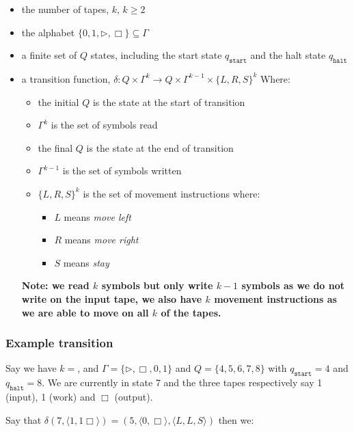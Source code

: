 \documentclass{article}
\begin{document}
\begin{itemize}
  \item the number of tapes, $k$, $k \geq 2$
  \item the alphabet $\{ 0,1,\rhd,\Box \} \subseteq \Gamma $
  \item a finite set of $Q$ states, including the start state $q_{\texttt{start} }$ and the halt state $q_{\texttt{halt} }$
  \item a transition function, $\delta: Q \times \Gamma^{k} \rightarrow Q \times \Gamma^{k-1}\times \{ L,R,S \}^{k} $
        Where:
        \begin{itemize}
          \item the initial $Q$ is the state at the start of transition
          \item $\Gamma^{k}$ is the set of symbols read
          \item the final $Q$ is the state at the end of transition
          \item $\Gamma^{k-1}$ is the set of symbols written
          \item $\{ L,R,S \}^{k} $ is the set of movement instructions where:
                \begin{itemize}
                  \item $L$ means \textit{move left}
                  \item $R$ means \textit{move right}
                  \item $S$ means \textit{stay}
                \end{itemize}
        \end{itemize}

        \textbf{Note: we read $k$ symbols but only write $k-1$ symbols as we do not write on the input tape, we also have $k$ movement instructions as we are able to move on all $k$ of the tapes.}
\end{itemize}

\subsubsection{Example transition}

Say we have $k=$, and $\Gamma = \{ \rhd, \Box, 0 ,1 \} $ and $Q = \{ 4,5,6,7,8 \} $ with $q_{\texttt{start} } = 4$ and $q_{\texttt{halt} } = 8$.
We are currently in state 7 and the three tapes respectively say 1 (input), 1 (work) and $\Box$ (output).

Say that $\delta(7, \langle 1,1 \Box \rangle ) = (5, \langle 0, \Box \rangle , \langle L,L,S \rangle )$ then we:
\end{document}
